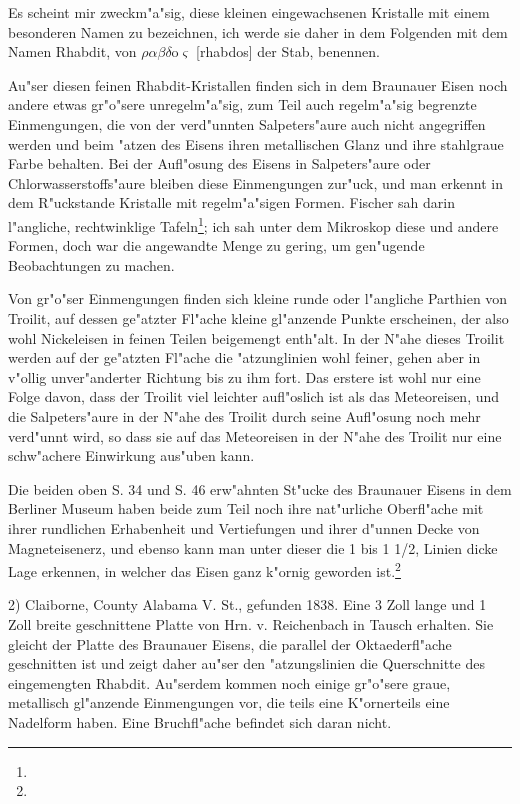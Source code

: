 \documentclass[a4paper, 11pt, oneside]{article}
\begin{document}
Es scheint mir zweckm"a"sig, diese kleinen eingewachsenen Kristalle mit einem besonderen Namen zu bezeichnen, ich werde sie daher in dem Folgenden mit dem Namen Rhabdit, von $\rho\alpha\beta\delta$o$\varsigma$ [rhabdos] der Stab, benennen.

Au"ser diesen feinen Rhabdit-Kristallen finden sich in dem Braunauer Eisen noch andere etwas gr"o"sere unregelm"a"sig, zum Teil auch regelm"a"sig begrenzte Einmengungen, die von der verd"unnten Salpeters"aure auch nicht angegriffen werden und beim "atzen des Eisens ihren metallischen Glanz und ihre stahlgraue Farbe behalten. Bei der Aufl"osung des Eisens in Salpeters"aure oder Chlorwasserstoffs"aure bleiben diese Einmengungen zur"uck, und man erkennt in dem R"uckstande Kristalle mit regelm"a"sigen Formen. Fischer sah darin l"angliche, rechtwinklige Tafeln\footnote{}; ich sah unter dem Mikroskop diese und andere Formen, doch war die angewandte Menge zu gering, um gen"ugende Beobachtungen zu machen.

Von gr"o"ser Einmengungen finden sich kleine runde oder l"angliche Parthien von Troilit, auf dessen ge"atzter Fl"ache kleine gl"anzende Punkte erscheinen, der also wohl Nickeleisen in feinen Teilen beigemengt enth"alt. In der N"ahe dieses Troilit werden auf der ge"atzten Fl"ache die "atzunglinien wohl feiner, gehen aber in v"ollig unver"anderter Richtung bis zu ihm fort. Das erstere ist wohl nur eine Folge davon, dass der Troilit viel leichter aufl"oslich ist als das Meteoreisen, und die Salpeters"aure in der N"ahe des Troilit durch seine Aufl"osung noch mehr verd"unnt wird, so dass sie auf das Meteoreisen in der N"ahe des Troilit nur eine schw"achere Einwirkung aus"uben kann.

Die beiden oben S. 34 und S. 46 erw"ahnten St"ucke des Braunauer Eisens in dem Berliner Museum haben beide zum Teil noch ihre nat"urliche Oberfl"ache mit ihrer rundlichen Erhabenheit und Vertiefungen und ihrer d"unnen Decke von Magneteisenerz, und ebenso kann man unter dieser die 1 bis 1 1/2, Linien dicke Lage erkennen, in welcher das Eisen ganz k"ornig geworden ist.\footnote{}

2) Claiborne, County Alabama V. St., gefunden 1838. Eine 3 Zoll lange und 1 Zoll breite geschnittene Platte von Hrn. v. Reichenbach in Tausch erhalten. Sie gleicht der Platte des Braunauer Eisens, die parallel der Oktaederfl"ache geschnitten ist und zeigt daher au"ser den "atzungslinien die Querschnitte des eingemengten Rhabdit. Au"serdem kommen noch einige gr"o"sere graue, metallisch gl"anzende Einmengungen vor, die teils eine K"ornerteils eine Nadelform haben. Eine Bruchfl"ache befindet sich daran nicht.
\end{document}
